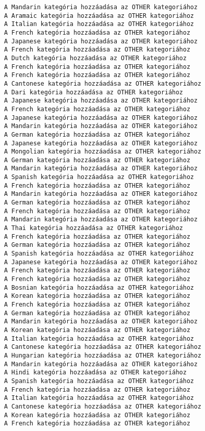 \documentclass[11pt]{article}
\begin{document}
\begin{Verbatim}[commandchars=\\\{\}]
A Mandarin kategória hozzáadása az OTHER kategoriához
A Aramaic kategória hozzáadása az OTHER kategoriához
A Italian kategória hozzáadása az OTHER kategoriához
A French kategória hozzáadása az OTHER kategoriához
A Japanese kategória hozzáadása az OTHER kategoriához
A French kategória hozzáadása az OTHER kategoriához
A Dutch kategória hozzáadása az OTHER kategoriához
A French kategória hozzáadása az OTHER kategoriához
A French kategória hozzáadása az OTHER kategoriához
A Cantonese kategória hozzáadása az OTHER kategoriához
A Dari kategória hozzáadása az OTHER kategoriához
A Japanese kategória hozzáadása az OTHER kategoriához
A French kategória hozzáadása az OTHER kategoriához
A Japanese kategória hozzáadása az OTHER kategoriához
A Mandarin kategória hozzáadása az OTHER kategoriához
A German kategória hozzáadása az OTHER kategoriához
A Japanese kategória hozzáadása az OTHER kategoriához
A Mongolian kategória hozzáadása az OTHER kategoriához
A German kategória hozzáadása az OTHER kategoriához
A Mandarin kategória hozzáadása az OTHER kategoriához
A Spanish kategória hozzáadása az OTHER kategoriához
A French kategória hozzáadása az OTHER kategoriához
A Mandarin kategória hozzáadása az OTHER kategoriához
A German kategória hozzáadása az OTHER kategoriához
A French kategória hozzáadása az OTHER kategoriához
A Mandarin kategória hozzáadása az OTHER kategoriához
A Thai kategória hozzáadása az OTHER kategoriához
A French kategória hozzáadása az OTHER kategoriához
A German kategória hozzáadása az OTHER kategoriához
A Spanish kategória hozzáadása az OTHER kategoriához
A Japanese kategória hozzáadása az OTHER kategoriához
A French kategória hozzáadása az OTHER kategoriához
A French kategória hozzáadása az OTHER kategoriához
A Bosnian kategória hozzáadása az OTHER kategoriához
A Korean kategória hozzáadása az OTHER kategoriához
A French kategória hozzáadása az OTHER kategoriához
A German kategória hozzáadása az OTHER kategoriához
A Mandarin kategória hozzáadása az OTHER kategoriához
A Korean kategória hozzáadása az OTHER kategoriához
A Italian kategória hozzáadása az OTHER kategoriához
A Cantonese kategória hozzáadása az OTHER kategoriához
A Hungarian kategória hozzáadása az OTHER kategoriához
A Mandarin kategória hozzáadása az OTHER kategoriához
A Hindi kategória hozzáadása az OTHER kategoriához
A Spanish kategória hozzáadása az OTHER kategoriához
A French kategória hozzáadása az OTHER kategoriához
A Italian kategória hozzáadása az OTHER kategoriához
A Cantonese kategória hozzáadása az OTHER kategoriához
A Korean kategória hozzáadása az OTHER kategoriához
A French kategória hozzáadása az OTHER kategoriához

\end{Verbatim}
\end{document}
